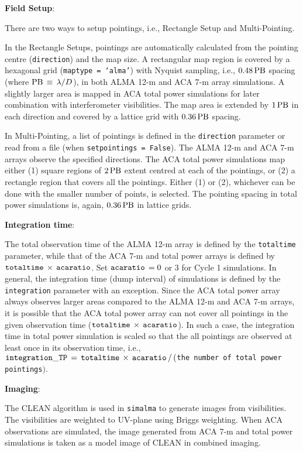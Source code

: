 \medskip
{\bf Field Setup}:

There are two ways to setup pointings, i.e., Rectangle Setup and
Multi-Pointing.

In the Rectangle Setups, pointings are automatically calculated from
the pointing centre ({\tt direction}) and the map size.
A rectangular map region is covered by a hexagonal grid
({\tt maptype = `alma'}) with Nyquist sampling, i.e.,
$ 0.48\, {\rm PB} $ spacing (where
$ {\rm PB} \, \equiv \, \lambda / D $), 
in both ALMA 12-m and ACA 7-m array simulations.
A slightly larger area is mapped in ACA total 
power simulations for later combination with interferometer 
visibilities. The map area is extended by $ 1 \, {\rm PB} $
in each direction and
covered by a lattice grid with $ 0.36\, {\rm PB} $ spacing.

In Multi-Pointing, a list of pointings is
defined in the {\tt direction} parameter or read from a file (when
{\tt setpointings = False}). The ALMA 12-m and ACA 7-m arrays observe
the specified directions.
The ACA total power simulations map either
(1) square regions of $ 2\, {\rm PB} $ extent centred at each of the
pointings, or 
(2) a rectangle region that covers all the pointings.
Either (1) or (2), whichever can be done with the smaller
number of points, is selected. The pointing spacing in total power
simulations is, again, $ 0.36\, {\rm PB} $ in lattice grids.


\medskip
{\bf Integration time}:

The total observation time of the ALMA 12-m array is defined by the
{\tt totaltime} parameter, while that of the ACA 7-m and total power
arrays is defined by $ {\tt totaltime} \, \times \, {\tt acaratio} $.
Set $ {\tt acaratio} \, = 0 $ or $ 3 $ for Cycle 1 simulations.
In general, the integration time (dump interval) of simulations is
defined by the {\tt integration} parameter with an exception.
Since the ACA total power array always observes larger areas compared
to the ALMA 12-m and ACA 7-m arrays, it is possible that the ACA total power array
can not cover all pointings in the given observation time 
($ {\tt totaltime} \, \times \, {\tt acaratio} $). 
In such a case, the integration time in total power simulation is scaled
so that the all pointings are observed at least once in its
observation time, i.e., 
${\tt integration\_TP} \, = \, {\tt totaltime} \, \times \, {\tt acaratio}
\, / \, ( ${\tt the number of total power pointings}$ ) $.


\medskip
{\bf Imaging}:

The CLEAN algorithm is used in {\tt simalma} to generate images
from visibilities. The visibilities are weighted to UV-plane using
Briggs weighting.
When ACA observations are simulated, the image generated from ACA 7-m
and total power simulations is taken as a model image of CLEAN in
combined imaging.




